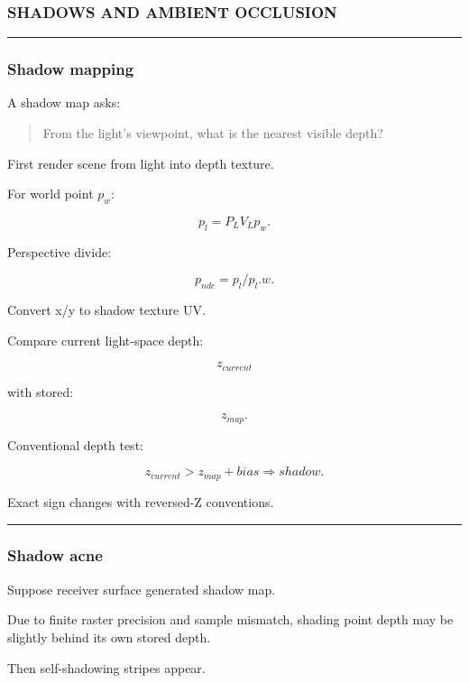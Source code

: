 \subsubsection{SHADOWS AND AMBIENT OCCLUSION}\label{shadows-and-ambient-occlusion}

\begin{center}\rule{0.5\linewidth}{0.5pt}\end{center}

\subsubsection{Shadow mapping}\label{shadow-mapping}

A shadow map asks:

\begin{quote}
From the light's viewpoint, what is the nearest visible depth?
\end{quote}

First render scene from light into depth texture.

For world point \(p_w\):

\[
p_l=
P_LV_Lp_w.
\]

Perspective divide:

\[
p_{ndc}
=
p_l/p_l.w.
\]

Convert x/y to shadow texture UV.

Compare current light-space depth:

\[
z_{current}
\]

with stored:

\[
z_{map}.
\]

Conventional depth test:

\[
\boxed{
z_{current}
>
z_{map}+bias
\Rightarrow
shadow.
}
\]

Exact sign changes with reversed-Z conventions.

\begin{center}\rule{0.5\linewidth}{0.5pt}\end{center}

\subsubsection{Shadow acne}\label{shadow-acne}

Suppose receiver surface generated shadow map.

Due to finite raster precision and sample mismatch, shading point depth may be slightly behind its own stored depth.

Then self-shadowing stripes appear.

